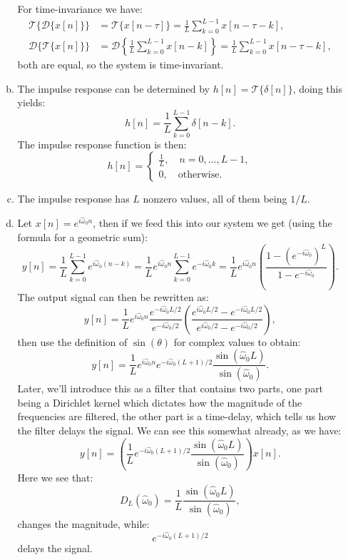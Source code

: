 \begin{enumerate}
\begin{enumerate}[a)]
For time-invariance we have:
\begin{align*}
    \mathcal{T}\{\mathcal{D}\{x[n]\}\}&=\mathcal{T}\{x[n-\tau]\}=\frac{1}{L}\sum_{k=0}^{L-1}x[n-\tau-k], \\
    \mathcal{D}\{\mathcal{T}\{x[n]\}\}&=\mathcal{D}\left\{\frac{1}{L}\sum_{k=0}^{L-1}x[n-k]\right\}=\frac{1}{L}\sum_{k=0}^{L-1}x[n-\tau-k],
\end{align*}
both are equal, so the system is time-invariant. 

\item The impulse response can be determined by $h[n]=\mathcal{T}\{\delta[n]\}$, doing this yields:
$$h[n]=\frac{1}{L}\sum_{k=0}^{L-1}\delta[n-k].$$
The impulse response function is then:
$$h[n]=\begin{cases}
    \frac{1}{L}, \quad n=0,\hdots,L-1, \\
    0, \quad \text{otherwise}.
\end{cases}$$

\item The impulse response has $L$ nonzero values, all of them being $1/L$. 

\item Let $x[n]=e^{i\hat{\omega}_{0}n}$, then if we feed this into our system we get (using the formula for a geometric sum):
$$y[n]=\frac{1}{L}\sum_{k=0}^{L-1}e^{i\hat{\omega}_{0}(n-k)}=\frac{1}{L}e^{i\hat{\omega}_{0}n}\sum_{k=0}^{L-1}e^{-i\hat{\omega}_{0}k}=\frac{1}{L}e^{i\hat{\omega}_{0}n}\left(\frac{1-(e^{-i\hat{\omega}_{0}})^{L}}{1-e^{-i\hat{\omega}_{0}}}\right).$$
The output signal can then be rewritten as:
$$y[n] = \frac{1}{L}e^{i\hat{\omega}_{0}n}\frac{e^{-i\hat{\omega}_{0}L/2}}{e^{-i\hat{\omega}_{0}/2}}\left(\frac{e^{i\hat{\omega}_{0}L/2} - e^{-i\hat{\omega}_{0}L/2}}{e^{i\hat{\omega}_{0}/2} - e^{-i\hat{\omega}_{0}/2}}\right),$$
then use the definition of $\sin(\theta)$ for complex values to obtain:
$$y[n] = \frac{1}{L}e^{i\hat{\omega}_{0}n}e^{-i\hat{\omega}_{0}(L +1)/2}\frac{\sin(\hat{\omega}_{0}L)}{\sin(\hat{\omega}_{0})}.$$
Later, we'll introduce this as a filter that contains two parts, one part being a Dirichlet kernel which dictates how the magnitude of the frequencies are filtered, the other part
is a time-delay, which tells us how the filter delays the signal. We can see this somewhat already, as we have:
$$y[n] = \left(\frac{1}{L}e^{-i\hat{\omega}_{0}(L +1)/2}\frac{\sin(\hat{\omega}_{0}L)}{\sin(\hat{\omega}_{0})}\right)x[n].$$
Here we see that:
$$D_{L}(\hat{\omega}_{0})=\frac{1}{L}\frac{\sin(\hat{\omega}_{0}L)}{\sin(\hat{\omega}_{0})},$$
changes the magnitude, while:
$$e^{-i\hat{\omega}_{0}(L +1)/2}$$
delays the signal. 


\end{enumerate}
\end{enumerate}
